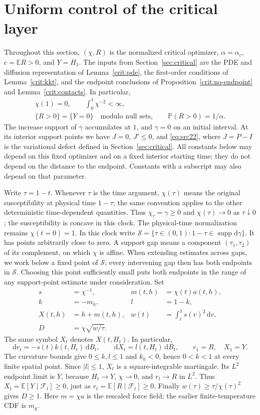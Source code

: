 \documentclass[11pt,a4paper]{article}
\numberwithin{equation}{section}
\theoremstyle{definition}
\theoremstyle{remark}
\newcommand{\E}{\mathbb E}
\newcommand{\Prob}{\mathbb P}
\newcommand{\dd}{\mathrm d}
\DeclareMathOperator{\supp}{supp}
\begin{document}
\section{Uniform control of the critical layer}\label{sec:scales}

Throughout this section, $(\chi,R)$ is the normalized critical optimizer,
$\alpha=\alpha_c$, $c=\E R>0$, and $Y=H_1$. The inputs from
Section~\ref{sec:critical} are the PDE and diffusion representation of
Lemma~\ref{crit:pde}, the first-order conditions of Lemma~\ref{crit:kkt},
and the endpoint conclusions of Proposition~\ref{crit:no-endpoint} and
Lemma~\ref{crit:contacts}. In particular,
\[
 \begin{gathered}
 \chi(1)=0,\qquad \int_0^1\chi^{-2}<\infty,\\
 \{R>0\}=\{Y=0\}\quad\text{modulo null sets},\qquad
 \Prob(R>0)=1/\alpha.
 \end{gathered}
\]
The increase support of $\gamma$ accumulates at $1$, and $\gamma=0$
on an initial interval. At its interior support points we have
$J=0$, $J'\le0$, and \eqref{eq:src22}, where $J=P-I$ is the
variational defect defined in Section~\ref{sec:critical}.
All constants below may depend on this fixed optimizer and on a fixed
interior starting time; they do not depend on the distance to the
endpoint. Constants with a subscript may also depend on that parameter.

Write $\tau=1-t$. Whenever $\tau$ is the time argument, $\chi(\tau)$
means the original susceptibility at physical time $1-\tau$; the same
convention applies to the other deterministic time-dependent quantities. Thus
$\chi_\tau=\gamma\ge0$ and $\chi(\tau)\to0$ as $\tau\downarrow0$;
the susceptibility is concave in this clock. The physical-time
normalization remains $\chi(t=0)=1$.
In this clock write
$\mathcal S=\{\tau\in(0,1):1-\tau\in\supp\dd\gamma\}$.
It has points arbitrarily close to zero. A support gap means a component
$(\tau_1,\tau_2)$ of its complement, on which $\chi$ is affine.
When extending estimates across gaps, we work below a fixed point of
$\mathcal S$; every intervening gap then has both endpoints in
$\mathcal S$. Choosing this point sufficiently small puts both endpoints
in the range of any support-point estimate under consideration.
Set
\[
 \begin{aligned}
 s&=\chi^{-1},& m(t,h)&=\chi(t)a(t,h),\\
 k&=-m_h,& l&=1-k,\\
 X(t,h)&=h+m(t,h),& w(t)&=\int_t^1s(v)^2\,\dd v,\\
 D&=\chi\sqrt{w/\tau}.&&
 \end{aligned}
\]
The same symbol $X_t$ denotes $X(t,H_t)$. In particular,
\[
 \dd r_t=-s(t)k(t,H_t)\,\dd B_t,\qquad
 \dd X_t=l(t,H_t)\,\dd B_t,
 \qquad r_1=R,\quad X_1=Y.
\]
The curvature bounds give $0\le k,l\le1$ and $k_h<0$, hence
$0<k<1$ at every finite spatial point. Since $|l|\le1$, $X_t$ is
a square-integrable martingale. Its $L^2$ endpoint limit is $Y$,
because $H_t\to Y$, $\chi\to0$, and $r_t\to R$ in $L^2$.
Thus $X_t=\E[Y\mid\mathcal F_t]\ge0$, just as
$r_t=\E[R\mid\mathcal F_t]\ge0$. Finally
$w(\tau)\ge\tau/\chi(\tau)^2$ gives $D\ge1$.
Here $m=\chi a$ is the rescaled force field; the earlier
finite-temperature CDF is $m_q$.
\end{document}
